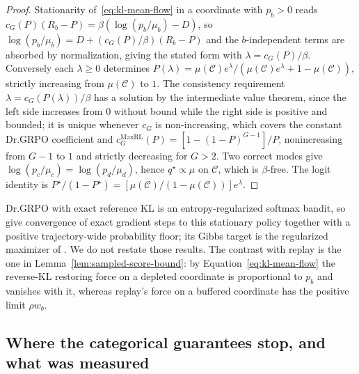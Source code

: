 \begin{proof}
\enforcehalffinalproseline
Stationarity of~\eqref{eq:kl-mean-flow} in a coordinate with $p_b>0$ reads
$c_G(P)(R_b-P)=\beta(\log(p_b/\mu_b)-D)$, so
$\log(p_b/\mu_b)=D+(c_G(P)/\beta)(R_b-P)$ and the $b$-independent terms are
absorbed by normalization, giving the stated form with $\lambda=c_G(P)/\beta$.
Conversely each $\lambda\ge0$ determines
$P(\lambda)=\mu(\mathcal C)e^\lambda/(\mu(\mathcal C)e^\lambda+1-\mu(\mathcal C))$,
strictly increasing from $\mu(\mathcal C)$ to $1$. The consistency requirement
$\lambda=c_G(P(\lambda))/\beta$ has a solution by the intermediate value
theorem, since the left side increases from $0$ without bound while the right
side is positive and bounded; it is unique whenever $c_G$ is non-increasing,
which covers the constant Dr.GRPO coefficient and
$c_G^{\mathrm{MaxRL}}(P)=[1-(1-P)^{G-1}]/P$, nonincreasing from $G-1$
to $1$ and strictly decreasing for $G>2$.
Two correct modes give $\log(p_c/\mu_c)=\log(p_d/\mu_d)$, hence
$q^\star\propto\mu$ on $\mathcal C$, which is $\beta$-free. The logit identity
is $P^\star/(1-P^\star)=[\mu(\mathcal C)/(1-\mu(\mathcal C))]e^\lambda$.
\end{proof}

Dr.GRPO with exact reference KL is an entropy-regularized softmax bandit, so
\citet[Theorem~5 and Lemma~13]{mei2020softmaxpg} give convergence of exact
gradient steps to this stationary policy together with a positive
trajectory-wide probability floor; its Gibbs target is the regularized
maximizer of \citet[Proposition~1]{geist2019regmdp}. We do not restate those
results. The contrast with replay is the one in
Lemma~\ref{lem:sampled-score-bound}: by Equation~\eqref{eq:kl-mean-flow} the
reverse-KL restoring force on a depleted coordinate is proportional to $p_b$
and vanishes with it, whereas replay's force on a buffered coordinate has the
positive limit $\rho w_b$.

\subsection{Where the categorical guarantees stop, and what was measured}
\label{app:theory-evidence-map}
\label{app:theory-entropy}
\label{app:theory-entropy-comparison}
\label{app:theory-neural-replay-response}
\label{app:theory-measured-signatures}

